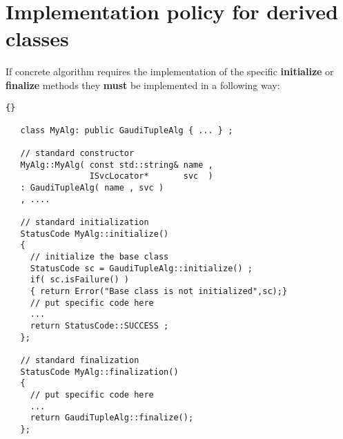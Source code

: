 \documentclass{lhcbnote}
\newcommand{\bftt}         {\ttfamily\bfseries}
\begin{document}
\section{Implementation policy for derived classes}
If concrete algorithm requires the implementation of
the specific {\bftt{initialize}} or
{\bftt{finalize}} methods they {\bftt{must}} be implemented
in a following way:

\begin{scriptsize}
 \begin{lstlisting}{}

   class MyAlg: public GaudiTupleAlg { ... } ;

   // standard constructor
   MyAlg::MyAlg( const std::string& name ,
                 ISvcLocator*       svc  )
   : GaudiTupleAlg( name , svc )
   , ....

   // standard initialization
   StatusCode MyAlg::initialize()
   {
     // initialize the base class
     StatusCode sc = GaudiTupleAlg::initialize() ;
     if( sc.isFailure() )
     { return Error("Base class is not initialized",sc);}
     // put specific code here
     ...
     return StatusCode::SUCCESS ;
   };

   // standard finalization
   StatusCode MyAlg::finalization()
   {
     // put specific code here
     ...
     return GaudiTupleAlg::finalize();
   };

 \end{lstlisting}
\end{scriptsize}
\end{document}
